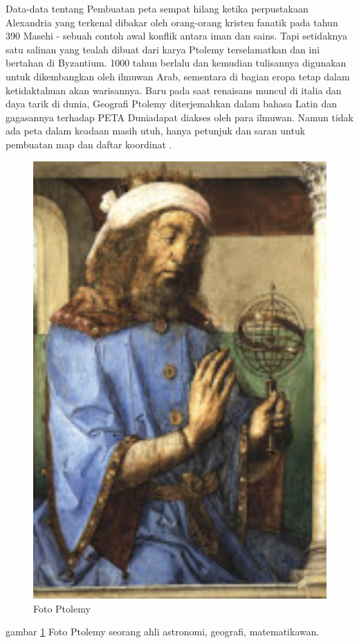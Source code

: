 	Data-data tentang Pembuatan peta sempat hilang ketika perpustakaan Alexandria yang terkenal dibakar oleh orang-orang kristen fanatik pada tahun 390 Masehi - sebuah contoh awal konflik antara iman dan sains. Tapi setidaknya satu salinan yang tealah dibuat dari karya Ptolemy terselamatkan dan ini bertahan di Byzantium. 1000 tahun berlalu dan kemudian tulisannya digunakan untuk dikembangkan oleh ilmuwan Arab, sementara di bagian eropa tetap dalam ketidaktahuan akan warisannya. Baru pada saat renaisans muncul di italia dan daya tarik di dunia, Geografi Ptolemy diterjemahkan dalam bahasa Latin dan gagasannya terhadap PETA Duniadapat diakses oleh para ilmuwan.
	Namun tidak ada peta dalam keadaan masih utuh, hanya petunjuk dan saran untuk pembuatan map dan daftar koordinat \cite{smart2005maps}.
	\begin{figure} [ht]
	\centerline{\includegraphics[width=1\textwidth]{figures/ptolemy.PNG}}
	\caption{Foto Ptolemy}
	\label{ptolemy}
	\end{figure}
	gambar \ref{ptolemy} Foto Ptolemy seorang ahli astronomi, geografi, matematikawan.

